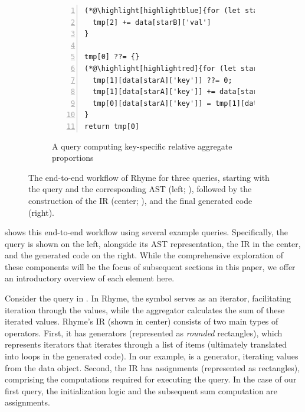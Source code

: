 \documentclass[runningheads]{llncs}
\newcommand{\lang}{Rhyme}
\begin{document}
\begin{figure}[t!]
\begin{subfigure}{\textwidth}
\begin{minipage}{0.38\textwidth}
\begin{lstlisting}[style=JavaScriptTiny, columns=flexible, numbers=left, xleftmargin=2pt]
(*@\highlight[highlightblue]{for (let starB in data)}@*) {  // loop hoisted!
  tmp[2] += data[starB]['val']
}

tmp[0] ??= {}
(*@\highlight[highlightred]{for (let starA in data)}@*) {
  tmp[1][data[starA]['key']] ??= 0;
  tmp[1][data[starA]['key']] += data[starA]['val']
  tmp[0][data[starA]['key']] = tmp[1][data[starA]['key']] / tmp[2] (*@\label{line:deps}@*)
}
return tmp[0]
\end{lstlisting}
\end{minipage}
\vspace{-2mm}
\caption{A query computing key-specific 
relative aggregate proportions
}\label{fig:intro_q3}
\end{subfigure}
\vspace{-2mm}
\caption{
The end-to-end workflow of \lang{} for three queries, starting with the query
and the corresponding AST (left; ),
followed by the construction of the IR (center; ), and the final generated code (right).
}\label{fig:intro} 
\vspace{-7mm}
\end{figure}

 shows this end-to-end workflow using several example queries.
Specifically, the query is shown on the left, alongside its AST representation,
the IR in the center, and the generated code on the right.
While the comprehensive exploration of these components will be the focus of
subsequent sections in this paper, we offer an introductory overview of each
element here.

Consider the query in .
In \lang{}, the \inline{*} symbol serves as an iterator, facilitating iteration through
the  values, while the aggregator  calculates the sum of
these iterated values.
\lang{}'s IR (shown in center) consists of two main types of operators.
First, it has generators (represented as \emph{rounded} rectangles), which represents iterators
that iterates through a list of items (ultimately translated into loops in
the generated code).
In our example,  is a generator, iterating values from the data object.
Second, the IR has assignments (represented as rectangles), comprising the
computations required for executing the query.
In the case of our first query, the initialization logic  and
the subsequent sum computation  are assignments.
\end{document}

